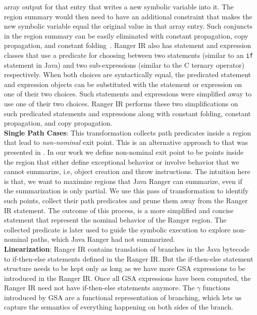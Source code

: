 array output for that entry that writes a new symbolic variable into it.
%
The region summary would then need to have an additional constraint that makes the new symbolic variable equal the
original value in that array entry.
%
Such conjuncts in the region summary can be easily eliminated with constant propagation, copy propagation, and constant
folding~\cite{dragon-book}.
%
Ranger IR also has statement and expression classes that use a predicate for choosing between two statements (similar to
an {\tt if} statement in Java) and two sub-expressions (similar to the C ternary operator) respectively.
%
When both choices are syntactically equal, the predicated statement and expression objects can be substituted with the
statement or expression on one of their two choices.
%
Such statements and expressions were simplified away to use one of their two choices.
%
Ranger IR performs these two simplifications on such predicated statements and expressions along with constant folding,
constant propagation, and copy propagation.\\
\textbf{Single Path Cases}: This transformation collects path predicates inside a region that lead to
\textit{non-nominal} exit point.
%
This is an alternative approach to that was presented in \cite{veritesting}.
%
In our work we define non-nominal exit point to be points inside the region that either define exceptional behavior or
involve behavior that we cannot summarize, i.e, object creation and throw instructions.
%
The intuition here is that, we want to maximize regions that Java Ranger can summarize, even if the summarization is
only partial.
%
We use this pass of transformation to identify such points, collect their path predicates and prune them away from the
Ranger IR statement.
%
The outcome of this process, is a more simplified and concise statement that represent the nominal behavior of the Ranger region.
%
The collected predicate is later used to guide the symbolic execution to explore non-nominal paths, which Java Ranger
had not summarized.  \\
%
\textbf{Linearization}:
Ranger IR contains translation of branches in the Java bytecode to if-then-else statements defined in the Ranger IR.
%
But the if-then-else statement structure needs to be kept only as long as we have more GSA expressions to be
introduced in the Ranger IR.
%
Once all GSA expressions have been computed, the Ranger IR need not have if-then-else statements anymore.
%
The $\gamma$ functions introduced by GSA are a functional representation of branching, which lets us
capture the semantics of everything happening on both sides of the branch.
